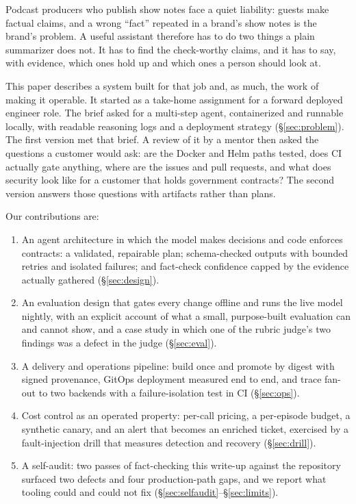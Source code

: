 \documentclass[11pt]{article}
\begin{document}
Podcast producers who publish show notes face a quiet liability: guests make factual claims, and a wrong ``fact'' repeated in a brand's show notes is the brand's problem. A useful assistant therefore has to do two things a plain summarizer does not. It has to find the check-worthy claims, and it has to say, with evidence, which ones hold up and which ones a person should look at.

This paper describes a system built for that job and, as much, the work of making it operable. It started as a take-home assignment for a forward deployed engineer role. The brief asked for a multi-step agent, containerized and runnable locally, with readable reasoning logs and a deployment strategy (\S\ref{sec:problem}). The first version met that brief. A review of it by a mentor then asked the questions a customer would ask: are the Docker and Helm paths tested, does CI actually gate anything, where are the issues and pull requests, and what does security look like for a customer that holds government contracts? The second version answers those questions with artifacts rather than plans.

Our contributions are:
\begin{enumerate}[leftmargin=*]
  \item An agent architecture in which the model makes decisions and code enforces contracts: a validated, repairable plan; schema-checked outputs with bounded retries and isolated failures; and fact-check confidence capped by the evidence actually gathered (\S\ref{sec:design}).
  \item An evaluation design that gates every change offline and runs the live model nightly, with an explicit account of what a small, purpose-built evaluation can and cannot show, and a case study in which one of the rubric judge's two findings was a defect in the judge (\S\ref{sec:eval}).
  \item A delivery and operations pipeline: build once and promote by digest with signed provenance, GitOps deployment measured end to end, and trace fan-out to two backends with a failure-isolation test in CI (\S\ref{sec:ops}).
  \item Cost control as an operated property: per-call pricing, a per-episode budget, a synthetic canary, and an alert that becomes an enriched ticket, exercised by a fault-injection drill that measures detection and recovery (\S\ref{sec:drill}).
  \item A self-audit: two passes of fact-checking this write-up against the repository surfaced two defects and four production-path gaps, and we report what tooling could and could not fix (\S\ref{sec:selfaudit}--\S\ref{sec:limits}).
\end{enumerate}
\end{document}

